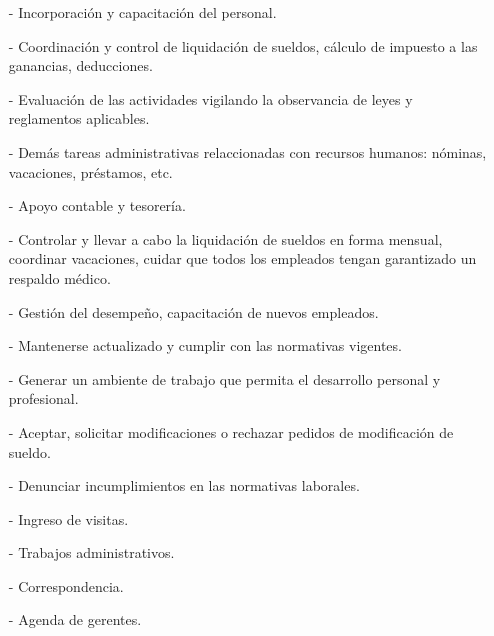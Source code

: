 \documentclass[a4paper,10pt,titlepage]{article}
\begin{document}
{
    \begin{itemize}
        \item[-] Incorporaci\'on y capacitaci\'on del personal.
        \item[-] Coordinaci\'on y control de liquidaci\'on de sueldos, c\'alculo de impuesto a las ganancias, deducciones.
        \item[-] Evaluaci\'on de las actividades vigilando la observancia de leyes y reglamentos aplicables.
        \item[-] Dem\'as tareas administrativas relaccionadas con recursos humanos: n\'ominas, vacaciones, pr\'estamos, etc.
        \item[-] Apoyo contable y tesorer\'ia.
    \end{itemize}
}
{
    \begin{itemize}
         \item[-] Controlar y llevar a cabo la liquidaci\'on de sueldos en forma mensual, coordinar vacaciones, cuidar que todos los empleados tengan garantizado un respaldo m\'edico.
        \item[-] Gesti\'on del desempeño, capacitaci\'on de nuevos empleados.
        \item[-] Mantenerse actualizado y cumplir con las normativas vigentes.
        \item[-] Generar un ambiente de trabajo que permita el desarrollo personal y profesional.
    \end{itemize}
}
{
    \begin{itemize}
        \item[-] Aceptar, solicitar modificaciones o rechazar pedidos de modificaci\'on de sueldo.
        \item[-] Denunciar incumplimientos en las normativas laborales.
    \end{itemize}
}


\newpage

{
    \begin{itemize}
        \item[-] Ingreso de visitas.
        \item[-] Trabajos administrativos.
    \end{itemize}
}
{
    \begin{itemize}
        \item[-] Correspondencia.
        \item[-] Agenda de gerentes.
    \end{itemize}
}
{

}
\end{document}

